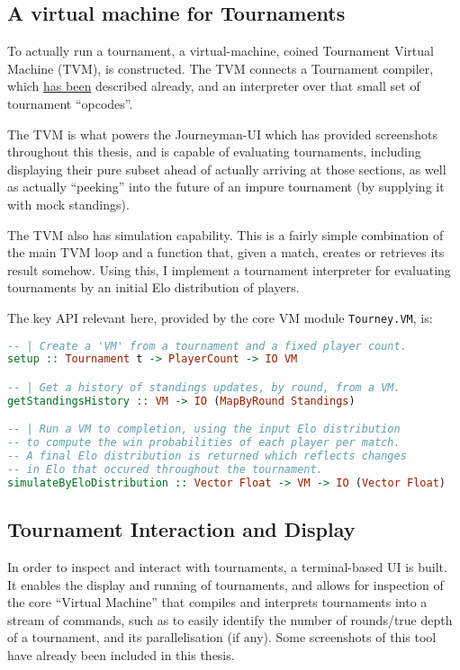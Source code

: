 \documentclass[a4,11pt,twoside,final,hidelinks]{article}
\begin{document}
\subsection{A virtual machine for Tournaments}
\label{sec:org09e6af8}

To actually run a tournament, a virtual-machine, coined Tournament Virtual
Machine (TVM), is constructed. The TVM connects a Tournament compiler, which \hyperref[compiler]{has
been} described already, and an interpreter over that small set of tournament
``opcodes''.

The TVM is what powers the Journeyman-UI which has provided screenshots
throughout this thesis, and is capable of evaluating tournaments, including
displaying their pure subset ahead of actually arriving at those sections, as
well as actually ``peeking'' into the future of an impure tournament (by supplying
it with mock standings).

The TVM also has simulation capability. This is a fairly simple combination of
the main TVM loop and a function that, given a match, creates or retrieves its
result somehow. Using this, I implement a tournament interpreter for evaluating
tournaments by an initial Elo distribution of players.

The key API relevant here, provided by the core VM module \texttt{Tourney.VM}, is:

\begin{lstlisting}[language=haskell,numbers=none]
-- | Create a 'VM' from a tournament and a fixed player count.
setup :: Tournament t -> PlayerCount -> IO VM

-- | Get a history of standings updates, by round, from a VM.
getStandingsHistory :: VM -> IO (MapByRound Standings)

-- | Run a VM to completion, using the input Elo distribution
-- to compute the win probabilities of each player per match.
-- A final Elo distribution is returned which reflects changes
-- in Elo that occured throughout the tournament.
simulateByEloDistribution :: Vector Float -> VM -> IO (Vector Float)
\end{lstlisting}

\subsection{Tournament Interaction and Display}
\label{sec:orgea7cdf3}

In order to inspect and interact with tournaments, a terminal-based UI is built.
It enables the display and running of tournaments, and allows for inspection of
the core ``Virtual Machine'' that compiles and interprets tournaments into a
stream of commands, such as to easily identify the number of rounds/true depth
of a tournament, and its parallelisation (if any). Some screenshots of this tool
have already been included in this thesis.
\end{document}
